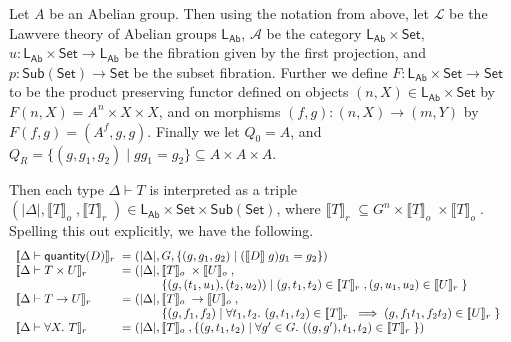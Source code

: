 \documentclass[a4paper,UKenglish]{lipics}
\newcommand{\msf}[1]{\mathsf{#1}} %
\newcommand{\Set}{\msf{Set}}
\newcommand{\Sub}[1]{\msf{Sub}(#1)}
\newcommand{\LAb}{\msf{L}_{\msf{Ab}}}
\newcommand{\A}{\mathcal{A}}
\newcommand{\sem}[1]{\ensuremath{\llbracket #1 \rrbracket} \;}
\newcommand{\semo}[1]{\ensuremath{\llbracket #1 \rrbracket _o} \;}
\newcommand{\semr}[1]{\ensuremath{\llbracket #1 \rrbracket _r} \;}
\newcommand{\qnt}{\msf{quantity}}
\begin{document}
\begin{example}\label{ex:relKen}
Let $A$ be an Abelian group. Then using the notation from above, let $\mathcal{L}$ be the Lawvere theory of Abelian groups $\LAb$, $\A$ be the category $\LAb \times \Set$, $u: \LAb \times \Set \rightarrow \LAb$ be the fibration given by the first projection, and $p:\Sub{\Set}\rightarrow \Set$ be the subset fibration. Further we define $F:\LAb \times \Set \rightarrow \Set$ to be the product preserving functor defined on objects $(n,X) \in \LAb \times \Set$ by $F(n, X) = A^{n} \times X \times X$, and on morphisms $(f, g) : (n,X) \rightarrow (m, Y)$ by $F(f,g) = (A^f, g, g)$. Finally we let $Q_0 = A$, and $Q_R = \{(g,g_1,g_2) \mathrel| gg_1 = g_2 \} \subseteq A \times A \times A$.

Then each type $\Delta \vdash T$ is interpreted as a triple $(|\Delta|, \semo{T}, \semr{T}) \in \LAb \times \Set \times \Sub{\Set}$, where $\semr{T} \subseteq G^n \times \semo{T} \times \semo{T}$. Spelling this out explicitly, we have the following.
\begin{displaymath}
  \begin{array}{l@{\hspace{0.3em}}c@{\hspace{0.3em}}l}
    \semr{\Delta \vdash \qnt(D)} & = & (|\Delta|, G, \{ (g, g_1, g_2) \mathrel| (\sem{D}g)g_1 = g_2 \}) \\
    \semr{\Delta \vdash T \times U} & = &
    (|\Delta|,
    \begin{array}[t]{@{}l}
      \semo{T} \times \semo{U}, \\
      \{ (g, (t_1,u_1), (t_2,u_2)) \mathrel| (g,t_1,t_2) \in \semr{T}, (g,u_1,u_2) \in \semr{U} \}
    \end{array}
    \\
    \semr{\Delta \vdash T \to U} & = &
    (|\Delta|,
    \begin{array}[t]{@{}l}
      \semo{T} \to \semo{U}, \\
      \{ (g, f_1, f_2) \mathrel| \forall t_1, t_2.~(g,t_1,t_2) \in \semr{T} \implies (g,f_1t_1, f_2t_2) \in \semr{U} \}
    \end{array}
    \\
    \semr{\Delta \vdash \forall X.~T} & = & (|\Delta|,
    \begin{array}[t]{@{}l}
     \semo{T},
      \{ (g, t_1, t_2) \mathrel| \forall g' \in G.~((g,g'), t_1, t_2) \in \semr{T} \} )
    \end{array}
  \end{array}
\end{displaymath}
\end{example}
\end{document}
